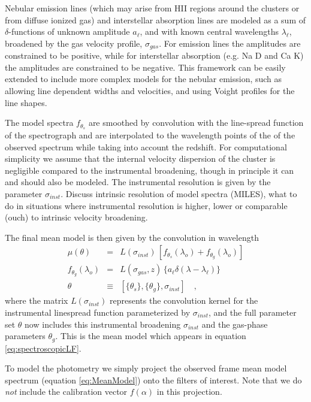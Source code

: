 \documentclass[iop,numberedappendix]{emulateapj}
\begin{document}
Nebular emission lines (which may arise from HII regions around the
clusters or from diffuse ionized gas) and interstellar absorption
lines are modeled as a sum of $\delta$-functions of unknown amplitude
$a_\ell$, and with known central wavelengths $\lambda_\ell$, broadened
by the gas velocity profile, $\sigma_{gas}$.  For emission lines the
amplitudes are constrained to be positive, while for interstellar
absorption (e.g. Na D and Ca K) the amplitudes are constrained to be
negative. This framework can be easily extended to include more
complex models for the nebular emission, such as allowing line
dependent widths and velocities, and using Voight profiles for the
line shapes.

The model spectra $f_{\theta_s}$ are smoothed by convolution with
the line-spread function of the spectrograph and are interpolated to
the wavelength points of the of the observed spectrum while taking
into account the redshift. For computational simplicity we assume that
the internal velocity dispersion of the cluster is negligible compared
to the instrumental broadening, though in principle it can and should
also be modeled. The instrumental resolution is given by the parameter
$\sigma_{inst}$.  {\color{blue}Discuss intrinsic resolution of model spectra
(MILES), what to do in situations where instrumental resolution is
higher, lower or comparable (ouch) to intrinsic velocity broadening.}


The final mean model is then given by the convolution in wavelength
\begin{eqnarray}\label{eq:MeanModel} 
\mu(\theta) &  = & L(\sigma_{inst}) \, \left[ f_{\theta_s}(\lambda_o)
                   + f_{\theta_g}(\lambda_o) \right]\\
f_{\theta_g}(\lambda_o) & = & L(\sigma_{gas}, z) \,  \{a_\ell\delta(\lambda-\lambda_\ell)\}\\
\theta & \equiv & \left[ \{\theta_s\}, \{\theta_{g}\}, \sigma_{inst} \right]
\quad ,
\end{eqnarray}
where the matrix $L(\sigma_{inst})$ represents the convolution kernel
for the instrumental linespread function parameterized by
$\sigma_{inst}$,
and the full parameter set $\theta$ now includes
this instrumental broadening $\sigma_{inst}$ 
and the gas-phase parameters $\theta_g$.
This is the mean model which appears in equation
\ref{eq:spectroscopicLF}.

To model the photometry we simply project the observed frame mean
model spectrum (equation \ref{eq:MeanModel}) onto the filters of
interest.  Note that we do \emph{not} include the calibration vector
$f(\alpha)$ in this projection.
\end{document}
